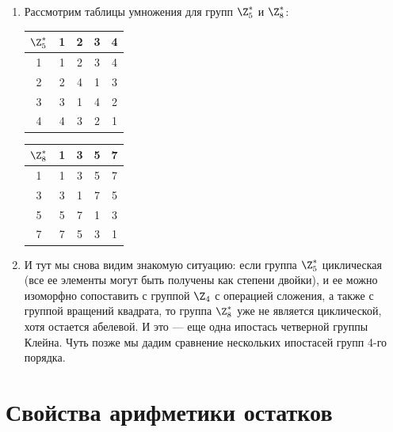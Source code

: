 \begin{enumerate}
\item Рассмотрим таблицы умножения для групп $\Z_5^*$ и $\Z_8^*$:
\begin{center}
\begin{tabular}{c||c|c|c|c|}
$\Z_5^*$  & 1 & 2 & 3 & 4 \\ \hline\hline
        1 & 1 & 2 & 3 & 4 \\ \hline
        2 & 2 & 4 & 1 & 3 \\ \hline
        3 & 3 & 1 & 4 & 2 \\ \hline
        4 & 4 & 3 & 2 & 1 \\ \hline
\end{tabular}
\qquad
\begin{tabular}{c||c|c|c|c|}
$\Z_8^*$  & 1 & 3 & 5 & 7 \\ \hline\hline
        1 & 1 & 3 & 5 & 7 \\ \hline
        3 & 3 & 1 & 7 & 5 \\ \hline
        5 & 5 & 7 & 1 & 3 \\ \hline
        7 & 7 & 5 & 3 & 1 \\ \hline
\end{tabular}
\end{center}
\item И тут мы снова видим знакомую ситуацию: если группа $\Z_5^*$ циклическая (все ее элементы могут быть получены как степени двойки), и ее можно изоморфно сопоставить с группой $\Z_4$ с операцией сложения, а также с группой вращений квадрата, то группа $\Z_8^*$ уже не является циклической, хотя остается абелевой. И это --- еще одна ипостась четверной группы Клейна. Чуть позже мы дадим сравнение нескольких ипостасей групп 4-го порядка.

\end{enumerate}




\section{Свойства арифметики остатков}



